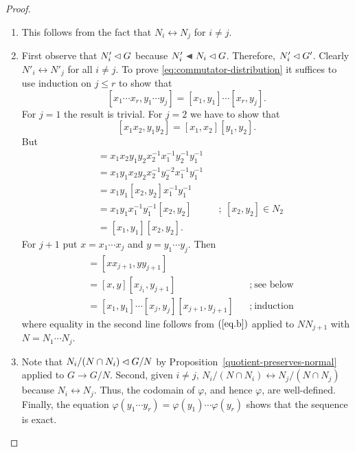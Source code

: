 \begin{proof}${}$
\begin{enumerate}[\rm a)]
    \item This follows from the fact that $N_i\leftrightarrow N_j$ for $i\ne j$.

    \item First observe that $N_i'\lhd G$ because $N_i'\ch N_i\normal G$. Therefore, $N'_i\lhd G'$. Clearly $N'_i\leftrightarrow N'_j$ for all $i\ne j$. To prove \eqref{eq:commutator-distribution} it suffices to use induction on $j\le r$ to show that
    $$
        [x_1\cdots x_r,y_1\cdots y_j] = [x_1,y_1]\cdots[x_r,y_j].
    $$
    For $j=1$ the result is trivial. For $j=2$ we have to show that
    \begin{equation}\label{eq.b}
        [x_1x_2,y_1y_2]=[x_1,x_2][y_1,y_2].
    \end{equation}
    But
    \begin{align*}
        [x_1x_2,y_1y_2] &= x_1x_2y_1y_2x_2^{-1}x_1^{-1}y_2^{-1}y_1^{-1}\\
            &= x_1y_1x_2y_2x_2^{-1}y_2^{-2}x_1^{-1}y_1^{-1}\\
            &= x_1y_1[x_2,y_2]x_1^{-1}y_1^{-1}\\
            &= x_1y_1x_1^{-1}y_1^{-1}[x_2,y_2]
                &&;\ [x_2,y_2]\in N_2\\
            &= [x_1,y_1][x_2,y_2].
    \end{align*}
    For $j+1$ put $x=x_1\cdots x_j$ and $y=y_1\cdots y_j$. Then
    \begin{align*}
        [x_1\cdots x_{j+1},y_1\cdots y_{j+1}]
            &= [xx_{j+1},yy_{j+1}]\\
            &= [x,y][x_{j_1},y_{j+1}]   &&;\ \text{see below}\\
            &= [x_1,y_1]\cdots[x_j,y_j][x_{j+1},y_{j+1}]   &&;\ \text{induction}
    \end{align*}
    where equality in the second line follows from $(\ref{eq.b})$ applied to $NN_{j+1}$ with $N=N_1\cdots N_j$.

    \item Note that $N_i/(N\cap N_i)\lhd G/N$ by Proposition~\ref{quotient-preserves-normal} applied to $G\to G/N$. Second, given $i\ne j$, $N_i/(N\cap N_i)\leftrightarrow N_j/(N\cap N_j)$ because $N_i\leftrightarrow N_j$. Thus, the codomain of $\varphi$, and hence $\varphi$, are well-defined. Finally, the equation $\varphi(y_1\cdots y_r)=\varphi(y_1)\cdots\varphi(y_r)$ shows that the sequence is exact.


\end{enumerate}
\end{proof}
